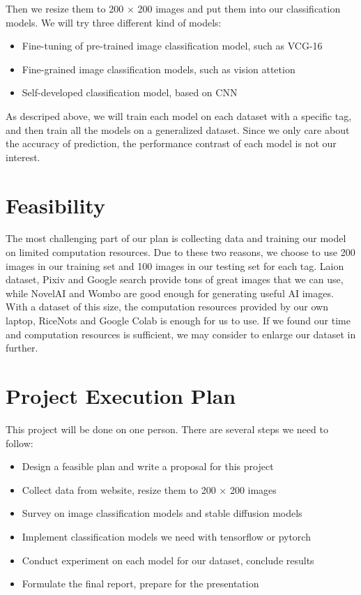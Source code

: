 \documentclass[10pt]{article}
\begin{document}
\vspace{10pt}

Then we resize them to 200 $\times$ 200 images and put them into our classification models. We will try three different kind of models:
\begin{itemize}
  \item Fine-tuning of pre-trained image classification model, such as VCG-16
  \item Fine-grained image classification models, such as vision attetion
  \item Self-developed classification model, based on CNN
\end{itemize}

As descriped above, we will train each model on each dataset with a specific tag, and then train all the models on a generalized dataset.
Since we only care about the accuracy of prediction, the performance contrast of each model is not our interest.

\section{Feasibility}

The most challenging part of our plan is collecting data and training our model on limited computation resources. Due to these two reasons,
we choose to use 200 images in our training set and 100 images in our testing set for each tag. Laion dataset, Pixiv and Google search provide
tons of great images that we can use, while NovelAI and Wombo are good enough for generating useful AI images. With a dataset of this size,
the computation resources provided by our own laptop, RiceNots and Google Colab is enough for us to use. If we found our time and computation resources
is sufficient, we may consider to enlarge our dataset in further.

\section{Project Execution Plan}

This project will be done on one person. There are several steps we need to follow:
\begin{itemize}
  \item Design a feasible plan and write a proposal for this project
  \item Collect data from website, resize them to 200 $\times$ 200 images
  \item Survey on image classification models and stable diffusion models
  \item Implement classification models we need with tensorflow or pytorch
  \item Conduct experiment on each model for our dataset, conclude results
  \item Formulate the final report, prepare for the presentation
\end{itemize}
\end{document}
